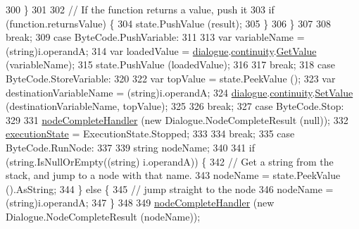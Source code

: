 \begin{DoxyCode}
300                     \}
301 
302                     \textcolor{comment}{// If the function returns a value, push it}
303                     \textcolor{keywordflow}{if} (\textcolor{keyword}{function}.returnsValue) \{
304                         state.PushValue (result);
305                     \}
306                 \}
307 
308                 \textcolor{keywordflow}{break};
309             \textcolor{keywordflow}{case} ByteCode.PushVariable:
311 
313                 var variableName = (string)i.operandA;
314                 var loadedValue = \hyperlink{a00152_ac506426c503da5f033247c29e11c5e82}{dialogue}.\hyperlink{a00082_ae94eaa4b03b432422f5d205fabe37ff5}{continuity}.\hyperlink{a00180_accab1fc5c8fc353dbfc53ca0f4029576}{GetValue} (variableName);
315                 state.PushValue (loadedValue);
316 
317                 \textcolor{keywordflow}{break};
318             \textcolor{keywordflow}{case} ByteCode.StoreVariable:
320 
322                 var topValue = state.PeekValue ();
323                 var destinationVariableName = (string)i.operandA;
324                 \hyperlink{a00152_ac506426c503da5f033247c29e11c5e82}{dialogue}.\hyperlink{a00082_ae94eaa4b03b432422f5d205fabe37ff5}{continuity}.\hyperlink{a00180_aa90ff61224432c5ed3ce72199c55f440}{SetValue} (destinationVariableName, topValue);
325 
326                 \textcolor{keywordflow}{break};
327             \textcolor{keywordflow}{case} ByteCode.Stop:
329 
331                 \hyperlink{a00152_a5129c63e67e2d4e2780d86b8351320a2}{nodeCompleteHandler} (\textcolor{keyword}{new} Dialogue.NodeCompleteResult (null));
332                 \hyperlink{a00152_a66491da06023dabfb63d09e6ccbba74f}{executionState} = ExecutionState.Stopped;
333 
334                 \textcolor{keywordflow}{break};
335             \textcolor{keywordflow}{case} ByteCode.RunNode:
337 
339                 \textcolor{keywordtype}{string} nodeName;
340 
341                 \textcolor{keywordflow}{if} (\textcolor{keywordtype}{string}.IsNullOrEmpty((\textcolor{keywordtype}{string}) i.operandA)) \{
342                     \textcolor{comment}{// Get a string from the stack, and jump to a node with that name.}
343                      nodeName = state.PeekValue ().AsString;
344                 \} \textcolor{keywordflow}{else} \{
345                     \textcolor{comment}{// jump straight to the node}
346                     nodeName = (string)i.operandA;
347                 \}
348 
349                 \hyperlink{a00152_a5129c63e67e2d4e2780d86b8351320a2}{nodeCompleteHandler} (\textcolor{keyword}{new} Dialogue.NodeCompleteResult (nodeName));

\end{DoxyCode}
